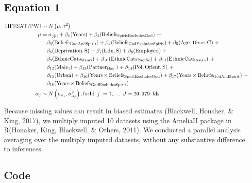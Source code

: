 \documentclass[
  english,
  man]{apa6}
\begin{document}
\hypertarget{equation-1}{%
\subsection{Equation 1}\label{equation-1}}

\[
\begin{aligned}
\operatorname{{\small LIFESAT/PWI}}  &\sim N \left(\mu,\sigma^2 \right) \\ \mu &=\alpha_{j[i]} + \beta_{1}(\operatorname{Years}) + \beta_{2}(\operatorname{Beliefs}_{\operatorname{SpiritExcludesGod}})\ + \\
&\quad \beta_{3}(\operatorname{Beliefs}_{\operatorname{GodAndSpirit}}) + \beta_{4}(\operatorname{Beliefs}_{\operatorname{GodExcludesSpirit}}) + \beta_{5}(\operatorname{Age.10yrs.C})\ + \\
&\quad \beta_{6}(\operatorname{Deprivation.S}) + \beta_{7}(\operatorname{Edu.S}) + \beta_{8}(\operatorname{Employed})\ + \\
&\quad \beta_{9}(\operatorname{EthnicCats}_{\operatorname{Maori}}) + \beta_{10}(\operatorname{EthnicCats}_{\operatorname{Pacific}}) + \beta_{11}(\operatorname{EthnicCats}_{\operatorname{Asian}})\ + \\
&\quad \beta_{12}(\operatorname{Male}_{\operatorname{1}}) + \beta_{13}(\operatorname{Partner}_{\operatorname{Has\ }}) + \beta_{14}(\operatorname{Pol.Orient.S})\ + \\
&\quad \beta_{15}(\operatorname{Urban}) + \beta_{16}(\operatorname{Years} \times \operatorname{Beliefs}_{\operatorname{SpiritExcludesGod}}) + \beta_{17}(\operatorname{Years} \times \operatorname{Beliefs}_{\operatorname{GodAndSpirit}})\ + \\
&\quad \beta_{18}(\operatorname{Years} \times \operatorname{Beliefs}_{\operatorname{GodExcludesSpirit}}) \\ \alpha_{j} &\sim N \left(\mu_{\alpha_{j}},\sigma^2_{\alpha_{j}} \right) , \operatorname{ for  Id }~j~= 1, \dots~J = 20,979~\operatorname{Ids}
\end{aligned}
\]

Because missing values can result in biased estimates (Blackwell, Honaker, \& King, 2017), we multiply imputed 10 datasets using the AmeliaII package in R(Honaker, King, Blackwell, \& Others, 2011). We conducted a parallel analysis averaging over the multiply imputed datasets, without any substantive difference to inferences.

\hypertarget{code}{%
\subsection{Code}\label{code}}
\end{document}

